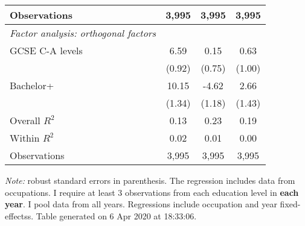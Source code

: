 \begin{center}
\begin{threeparttable}[!h]
\begin{tabular}{lccc}
Observations        &       3,995         &       3,995         &       3,995         \\
\midrule\vspace{1mm} \textit{Factor analysis: orthogonal factors} \\ 
\hspace{3mm}GCSE C-A levels&        6.59\sym{***}&        0.15         &        0.63         \\
                    &      (0.92)         &      (0.75)         &      (1.00)         \\
\hspace{3mm}Bachelor+&       10.15\sym{***}&       -4.62\sym{***}&        2.66         \\
                    &      (1.34)         &      (1.18)         &      (1.43)         \\
\midrule Overall $ R^2$&        0.13         &        0.23         &        0.19         \\
Within $ R^2$       &        0.02         &        0.01         &        0.00         \\
Observations        &       3,995         &       3,995         &       3,995         \\
\bottomrule
\bottomrule
\end{tabular}
\begin{tablenotes}
\item\footnotesize\textit{Note:} robust standard errors in parenthesis. The regression includes data from occupations. I require at least 3 observations from each education level in \textbf{each year}. I pool data from all years. Regressions include occupation and year fixed-effectss. Table generated on  6 Apr 2020 at 18:33:06.
\end{tablenotes}
\end{threeparttable}
\end{center}
